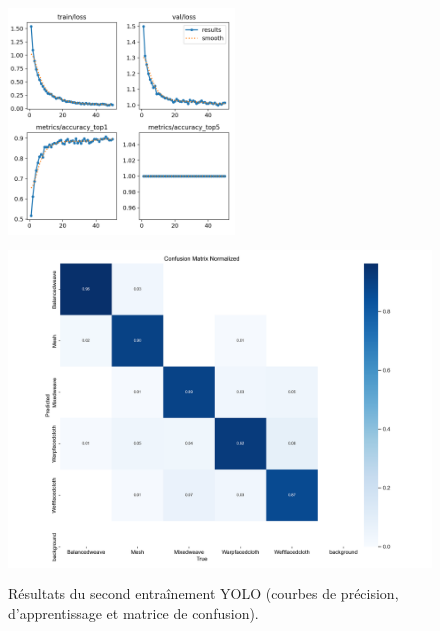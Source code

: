 \begin{figure}[!h]
    \begin{minipage}[c]{.4\linewidth}
            \begin{center}
                \includegraphics[height=6cm]{../images/YOLO_eq_augment.png}
            \end{center}
    \end{minipage}
        \begin{minipage}[c]{.6\linewidth}
        \begin{center}
        		\includegraphics[height=9cm]{../images/YOLO_eq_augment_confusion_matrix_normalized.png}
	\end{center}
    \end{minipage}
    \caption{Résultats du second entraînement YOLO (courbes de précision, d'apprentissage et matrice de confusion).}
    \label{fig:YOLO_eq}   
\end{figure}

